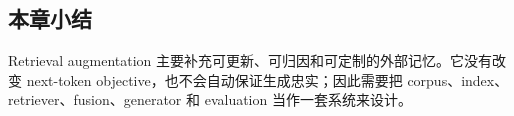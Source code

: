 \subsection{本章小结}

Retrieval augmentation 主要补充可更新、可归因和可定制的外部记忆。它没有改变 next-token objective，也不会自动保证生成忠实；因此需要把 corpus、index、retriever、fusion、generator 和 evaluation 当作一套系统来设计。

